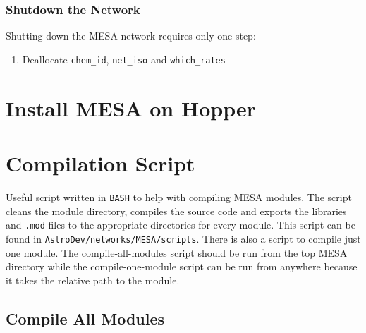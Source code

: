 \subsubsection{Shutdown the Network}

Shutting down the {\sf MESA} network requires only one step:
\begin{enumerate}
\item Deallocate {\tt chem\_id}, {\tt net\_iso} and {\tt which\_rates}
\end{enumerate}


\section{Install {\sf MESA} on Hopper}
\label{sec:hopper_install}



\section{Compilation Script}
 \label{sec:compile_scripts}

Useful script written in {\tt BASH} to help with compiling {\sf MESA} modules. 
The script cleans the module directory, compiles the source code and exports 
the libraries and {\tt .mod} files to the appropriate directories for every 
module. This script can be found in {\tt AstroDev/networks/MESA/scripts}. 
There is also a script to compile just one module. The compile-all-modules 
script should be run from the top {\sf MESA} directory while the 
compile-one-module script can be run from anywhere because it takes the 
relative path to the module.

\subsection{Compile All Modules}




